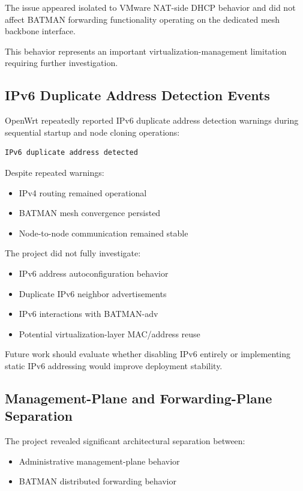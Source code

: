 \documentclass[conference]{IEEEtran}
\begin{document}
The issue appeared isolated to VMware NAT-side DHCP behavior and did not affect BATMAN forwarding functionality operating on the dedicated mesh backbone interface.

This behavior represents an important virtualization-management limitation requiring further investigation.

\subsection{IPv6 Duplicate Address Detection Events}

OpenWrt repeatedly reported IPv6 duplicate address detection warnings during sequential startup and node cloning operations:

\begin{lstlisting}
IPv6 duplicate address detected
\end{lstlisting}

Despite repeated warnings:

\begin{itemize}
    \item IPv4 routing remained operational
    \item BATMAN mesh convergence persisted
    \item Node-to-node communication remained stable
\end{itemize}

The project did not fully investigate:

\begin{itemize}
    \item IPv6 address autoconfiguration behavior
    \item Duplicate IPv6 neighbor advertisements
    \item IPv6 interactions with BATMAN-adv
    \item Potential virtualization-layer MAC/address reuse
\end{itemize}

Future work should evaluate whether disabling IPv6 entirely or implementing static IPv6 addressing would improve deployment stability.

\subsection{Management-Plane and Forwarding-Plane Separation}

The project revealed significant architectural separation between:

\begin{itemize}
    \item Administrative management-plane behavior
    \item BATMAN distributed forwarding behavior
\end{itemize}
\end{document}
